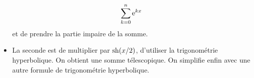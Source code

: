 \documentclass{magnolia}
\begin{document}
\begin{exos}
\begin{sol}
\begin{itemize}
  \[\sum_{k=0}^n {\rm e}^{kx}\]
  et de prendre la partie impaire de la somme.
\item La seconde est de multiplier par $\operatorname{sh}(x/2)$, d'utiliser la trigonométrie hyperbolique. On obtient une somme télescopique. On simplifie enfin avec une autre formule de trigonométrie hyperbolique.
  \end{itemize}
  \end{sol}
\end{exos}
\end{document}
